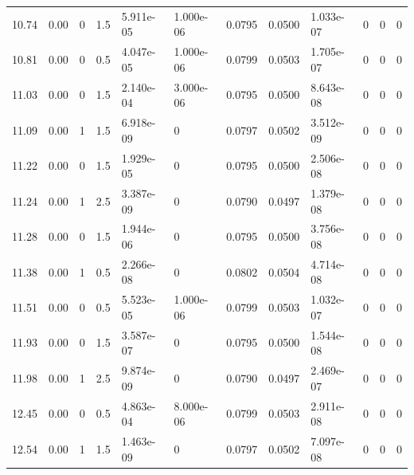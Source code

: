 \documentclass[preview]{standalone}
\begin{document}
{{{\begin{tabular}{L{1.2cm}C{1.2cm} C{0.3cm}C{0.5cm} C{1.4cm}C{1.4cm} C{1.4cm}C{1.4cm} C{1.6cm}C{1.6cm} C{1.6cm}C{1.6cm}}
  10.74  &  0.00  & 0     & 1.5 &  5.911e-05  & 1.000e-06  &  0.0795&   0.0500& 1.033e-07 & 0   &  0 & 0  \\ 
  10.81  &  0.00  & 0     & 0.5 &  4.047e-05  & 1.000e-06  &  0.0799&   0.0503& 1.705e-07 & 0   &  0 & 0  \\ 
  11.03  &  0.00  & 0     & 1.5 &  2.140e-04  & 3.000e-06  &  0.0795&   0.0500& 8.643e-08 & 0   &  0 & 0  \\ 
  11.09  &  0.00  & 1     & 1.5 &  6.918e-09  & 0  &  0.0797&   0.0502& 3.512e-09 & 0   &  0 & 0  \\ 
  11.22  &  0.00  & 0     & 1.5 &  1.929e-05  & 0  &  0.0795&   0.0500& 2.506e-08 & 0   &  0 & 0  \\ 
  11.24  &  0.00  & 1     & 2.5 &  3.387e-09  & 0  &  0.0790&   0.0497& 1.379e-08 & 0   &  0 & 0  \\ 
  11.28  &  0.00  & 0     & 1.5 &  1.944e-06  & 0  &  0.0795&   0.0500& 3.756e-08 & 0   &  0 & 0  \\ 
  11.38  &  0.00  & 1     & 0.5 &  2.266e-08  & 0  &  0.0802&   0.0504& 4.714e-08 & 0   &  0 & 0  \\ 
  11.51  &  0.00  & 0     & 0.5 &  5.523e-05  & 1.000e-06  &  0.0799&   0.0503& 1.032e-07 & 0   &  0 & 0  \\ 
  11.93  &  0.00  & 0     & 1.5 &  3.587e-07  & 0  &  0.0795&   0.0500& 1.544e-08 & 0   &  0 & 0  \\ 
  11.98  &  0.00  & 1     & 2.5 &  9.874e-09  & 0  &  0.0790&   0.0497& 2.469e-07 & 0   &  0 & 0  \\ 
  12.45  &  0.00  & 0     & 0.5 &  4.863e-04  & 8.000e-06  &  0.0799&   0.0503& 2.911e-08 & 0   &  0 & 0  \\ 
  12.54  &  0.00  & 1     & 1.5 &  1.463e-09  & 0  &  0.0797&   0.0502& 7.097e-08 & 0   &  0 & 0  \\ 
\hline 
\end{tabular} 

}}}
\end{document}
